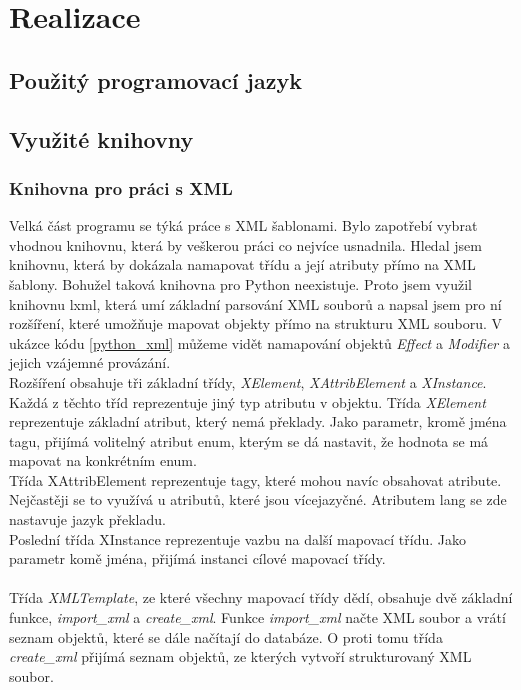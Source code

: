 \documentclass[thesis=B,czech]{resources/FITthesis}[2012/06/26]
\begin{document}
\chapter{Realizace}
\section{Použitý programovací jazyk}

\section{Využité knihovny}
\subsection{Knihovna pro práci s XML}
Velká část programu se týká práce s XML šablonami. Bylo zapotřebí vybrat vhodnou knihovnu, která by veškerou práci co nejvíce usnadnila. Hledal jsem knihovnu, která by dokázala namapovat třídu a její atributy přímo na XML šablony. Bohužel taková knihovna pro Python neexistuje. Proto jsem využil knihovnu lxml\cite{lxml}, která umí základní parsování XML souborů a napsal jsem pro ní rozšíření, které umožňuje mapovat objekty přímo na strukturu XML souboru. V ukázce kódu \ref{python_xml} můžeme vidět namapování objektů \textit{Effect} a \textit{Modifier} a jejich vzájemné provázání. \\
Rozšíření obsahuje tři základní třídy, \textit{XElement}, \textit{XAttribElement} a \textit{XInstance}. Každá z těchto tříd reprezentuje jiný typ atributu v objektu. Třída \textit{XElement} reprezentuje základní atribut, který nemá překlady. Jako parametr, kromě jména tagu, přijímá volitelný atribut enum, kterým se dá nastavit, že hodnota se má mapovat na konkrétním enum.\\
Třída XAttribElement reprezentuje tagy, které mohou navíc obsahovat atribute. Nejčastěji se to využívá u atributů, které jsou vícejazyčné. Atributem lang se zde nastavuje jazyk překladu.\\
Poslední třída XInstance reprezentuje vazbu na další mapovací třídu. Jako parametr komě jména, přijímá instanci cílové mapovací třídy.\\
\\
Třída \textit{XMLTemplate}, ze které všechny mapovací třídy dědí, obsahuje dvě základní funkce, \textit{import\_xml} a \textit{create\_xml}. Funkce \textit{import\_xml} načte XML soubor a vrátí seznam objektů, které se dále načítají do databáze. O proti tomu třída \textit{create\_xml} přijímá seznam objektů, ze kterých vytvoří strukturovaný XML soubor.
\end{document}
